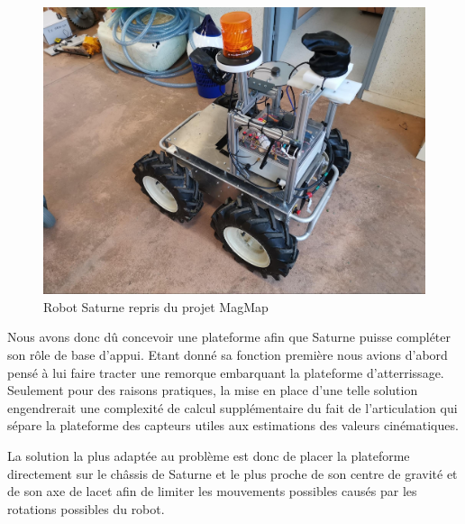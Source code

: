 \begin{figure}[H]
    \centering\includegraphics[width=150mm]{images/ugv/ugv1.jpg}
    \caption{Robot Saturne repris du projet MagMap \cite{magmap}}
\end{figure}

Nous avons donc dû concevoir une plateforme afin que Saturne puisse compléter son rôle de base d’appui. Etant donné sa fonction première nous avions d’abord pensé à lui faire tracter une remorque embarquant la plateforme d’atterrissage. Seulement pour des raisons pratiques, la mise en place d’une telle solution engendrerait une complexité de calcul supplémentaire du fait de l’articulation qui sépare la plateforme des capteurs utiles aux estimations des valeurs cinématiques.

La solution la plus adaptée au problème est donc de placer la plateforme directement sur le châssis de Saturne et le plus proche de son centre de gravité et de son axe de lacet afin de limiter les mouvements possibles causés par les rotations possibles du robot.

